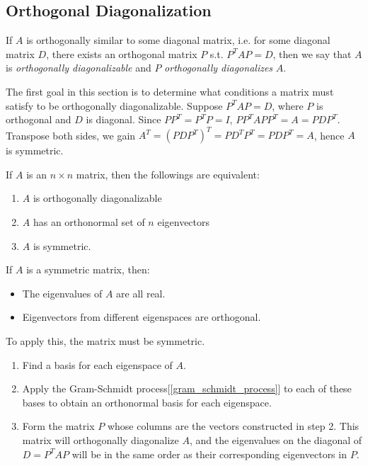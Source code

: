 \documentclass{report}
\begin{document}
		\subsection{Orthogonal Diagonalization}\label{chap_orthogonal_diagonalization}
		\begin{defn}
			If $A$ is orthogonally similar to some diagonal matrix, i.e. for some diagonal matrix $D$, there exists an orthogonal matrix $P$ s.t. $P^TAP=D$, then we say that $A$ is \emph{orthogonally diagonalizable} and $P$ \emph{orthogonally diagonalizes} $A$.
		\end{defn}
		
		The first goal in this section is to determine what conditions a matrix must satisfy to be orthogonally diagonalizable. Suppose $P^TAP=D$, where $P$ is orthogonal and $D$ is diagonal. Since $PP^T=P^TP=I$, $PP^TAPP^T=A=PDP^T$. Transpose both sides, we gain $A^T=(PDP^T)^T=PD^TP^T=PDP^T=A$, hence $A$ is symmetric.
		
		\begin{thm}
			If $A$ is an $n \times n$ matrix, then the followings are equivalent:
			\begin{enumerate}
				\item $A$ is orthogonally diagonalizable
				\item $A$ has an orthonormal set of $n$ eigenvectors
				\item $A$ is symmetric.
			\end{enumerate}
		\end{thm}
		
		\begin{thm}
			If $A$ is a symmetric matrix, then:
			\begin{itemize}
				\item The eigenvalues of $A$ are all real.
				\item Eigenvectors from different eigenspaces are orthogonal.
			\end{itemize}
		\end{thm}
		
		\begin{mthd}
			To apply this, the matrix must be symmetric.
			\begin{enumerate}
				\item Find a basis for each eigenspace of $A$.
				\item Apply the Gram-Schmidt process[\ref{gram_schmidt_process}] to each of these bases to obtain an orthonormal basis for each eigenspace.
				\item Form the matrix $P$ whose columns are the vectors constructed in step 2. This matrix will orthogonally diagonalize $A$, and the eigenvalues on the diagonal of $D=P^TAP$ will be in the same order as their corresponding eigenvectors in $P$.
			\end{enumerate}
		\end{mthd}
		
\end{document}

